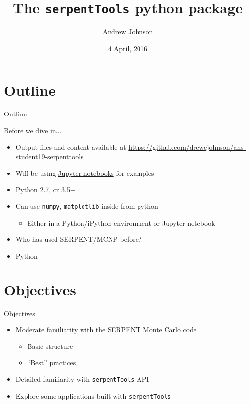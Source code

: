 \documentclass{beamer}
\title{The \texttt{serpentTools} python package}
\author{Andrew Johnson}
\date[2019 ANS Student Conference]{4 April, 2016}
\newcommand{\st}{\texttt{serpentTools} }
\begin{document}
\begin{frame}
\titlepage
\end{frame}

\section*{Outline}
\begin{frame}{Outline}
    \begin{multicols}{2}
        \tableofcontents[hideallsubsections]
    \end{multicols}
\end{frame}

\begin{frame}{Before we dive in...}
    \begin{itemize}
        \item{Output files and content available at \url{https://github.com/drewejohnson/ans-student19-serpenttools}}
        \item Will be using \href{https://jupyter.org/}{Jupyter notebooks} for examples
        \item Python 2.7, or 3.5+
        \item Can use \texttt{numpy}, \texttt{matplotlib} inside from python
            \begin{itemize}
                \item Either in a Python/iPython environment or Jupyter notebook
            \end{itemize}
        \item{Who has used SERPENT/MCNP before?}
        \item{Python}
    \end{itemize}
\end{frame}

\section{Objectives}

\begin{frame}{Objectives}
    \begin{itemize}
        \item Moderate familiarity with the SERPENT Monte Carlo code
        \begin{itemize}
            \item Basic structure
            \item ``Best'' practices
        \end{itemize}
        \item Detailed familiarity with \st API
        \item Explore some applications built with \st
    \end{itemize}
\end{frame}
\end{document}
